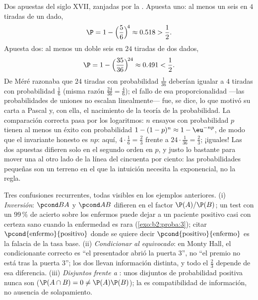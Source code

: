 \begin{example}\label{ex:b2:proba:demere}
Dos apuestas del siglo XVII, zanjadas por la . Apuesta
uno: al menos un seis en $4$ tiradas de un dado,
\[
\P = 1 - \Bigl(\frac56\Bigr)^{\!4} \approx 0.518 > \frac12 .
\]
Apuesta dos: al menos un doble seis en $24$ tiradas de dos dados,
\[
\P = 1 - \Bigl(\frac{35}{36}\Bigr)^{\!24} \approx 0.491 <
\frac12 .
\]
De Méré razonaba que $24$ tiradas con probabilidad $\frac1{36}$
deberían igualar a $4$ tiradas con probabilidad $\frac16$ (misma
razón $\frac{24}{36} = \frac46$); el fallo de esa proporcionalidad
---las probabilidades de uniones no escalan linealmente--- fue, se
dice, lo que motivó su carta a Pascal y, con ella, el nacimiento de
la teoría de la probabilidad. La comparación correcta pasa por los
logaritmos: $n$ ensayos con probabilidad $p$ tienen al menos un éxito
con probabilidad $1 - (1-p)^n \approx 1 - \eu^{-np}$, de modo que el
invariante honesto es $np$: aquí, $4\cdot\frac16 = \frac23$ frente a
$24\cdot\frac1{36} = \frac23$; ¡iguales! Las dos apuestas difieren
solo en el segundo orden en $p$, y justo lo bastante para mover una
al otro lado de la línea del cincuenta por ciento: las probabilidades
pequeñas son un terreno en el que la intuición necesita la
exponencial, no la regla.
\end{example}

\begin{remark}
Tres confusiones recurrentes, todas visibles en los ejemplos
anteriores. (i) \emph{Inversión}: $\pcond BA$ y $\pcond AB$ difieren
en el factor $\P(A)/\P(B)$; un test con un $99\,\%$ de acierto sobre
los enfermos puede dejar a un paciente positivo casi con certeza sano
cuando la enfermedad es rara (\cref{exo:b2:proba:3}); citar
$\pcond{\text{enfermo}}{\text{positivo}}$ donde se quiere decir
$\pcond{\text{positivo}}{\text{enfermo}}$ es la falacia de la tasa
base. (ii) \emph{Condicionar al  equivocado}: en Monty Hall, el
 condicionante correcto es ``el presentador abrió la puerta
$3$'', no ``el premio no está tras la puerta $3$''; los dos llevan
información distinta, y todo el $\frac23$ depende de esa diferencia.
(iii) \emph{Disjuntos frente a }: unos  disjuntos
de probabilidad positiva nunca son  ($\P(A\cap B) = 0
\neq \P(A)\P(B)$); la  es compatibilidad de información,
no ausencia de solapamiento.
\end{remark}

